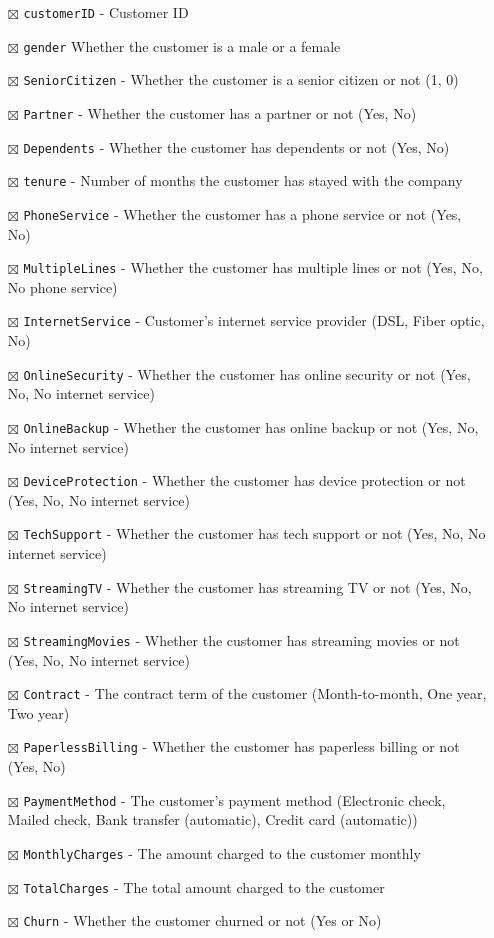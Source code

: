 \documentclass[
  letterpaper,
  DIV=11,
  numbers=noendperiod]{scrreprt}
\providecommand{\tightlist}{%
  \setlength{\itemsep}{0pt}\setlength{\parskip}{0pt}}\usepackage{longtable,booktabs,array}
\begin{document}
\begin{itemize}
\tightlist
\item[$\boxtimes$]
  \texttt{customerID} - Customer ID
\item[$\boxtimes$]
  \texttt{gender} Whether the customer is a male or a female
\item[$\boxtimes$]
  \texttt{SeniorCitizen} - Whether the customer is a senior citizen or
  not (1, 0)
\item[$\boxtimes$]
  \texttt{Partner} - Whether the customer has a partner or not (Yes, No)
\item[$\boxtimes$]
  \texttt{Dependents} - Whether the customer has dependents or not (Yes,
  No)
\item[$\boxtimes$]
  \texttt{tenure} - Number of months the customer has stayed with the
  company
\item[$\boxtimes$]
  \texttt{PhoneService} - Whether the customer has a phone service or
  not (Yes, No)
\item[$\boxtimes$]
  \texttt{MultipleLines} - Whether the customer has multiple lines or
  not (Yes, No, No phone service)
\item[$\boxtimes$]
  \texttt{InternetService} - Customer's internet service provider (DSL,
  Fiber optic, No)
\item[$\boxtimes$]
  \texttt{OnlineSecurity} - Whether the customer has online security or
  not (Yes, No, No internet service)
\item[$\boxtimes$]
  \texttt{OnlineBackup} - Whether the customer has online backup or not
  (Yes, No, No internet service)
\item[$\boxtimes$]
  \texttt{DeviceProtection} - Whether the customer has device protection
  or not (Yes, No, No internet service)
\item[$\boxtimes$]
  \texttt{TechSupport} - Whether the customer has tech support or not
  (Yes, No, No internet service)
\item[$\boxtimes$]
  \texttt{StreamingTV} - Whether the customer has streaming TV or not
  (Yes, No, No internet service)
\item[$\boxtimes$]
  \texttt{StreamingMovies} - Whether the customer has streaming movies
  or not (Yes, No, No internet service)
\item[$\boxtimes$]
  \texttt{Contract} - The contract term of the customer (Month-to-month,
  One year, Two year)
\item[$\boxtimes$]
  \texttt{PaperlessBilling} - Whether the customer has paperless billing
  or not (Yes, No)
\item[$\boxtimes$]
  \texttt{PaymentMethod} - The customer's payment method (Electronic
  check, Mailed check, Bank transfer (automatic), Credit card
  (automatic))
\item[$\boxtimes$]
  \texttt{MonthlyCharges} - The amount charged to the customer monthly
\item[$\boxtimes$]
  \texttt{TotalCharges} - The total amount charged to the customer
\item[$\boxtimes$]
  \texttt{Churn} - Whether the customer churned or not (Yes or No)
\end{itemize}
\end{document}
